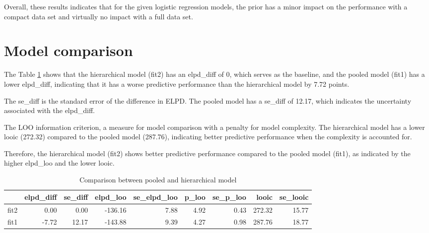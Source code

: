 \documentclass[a4paper]{artikel3}
\begin{document}
Overall, these results indicates that for the given logistic regression models, the prior has a minor impact on the performance with a compact data set and virtually no impact with a full data set.

\section{Model comparison}

The Table \ref{tab:model_compare} shows that the hierarchical model (fit2) has an elpd\_diff of 0, which serves as the baseline, and the pooled model (fit1) has a lower elpd\_diff, indicating that it has a worse predictive performance than the hierarchical model by 7.72 points.

The se\_diff is the standard error of the difference in ELPD. The pooled model has a se\_diff of 12.17, which indicates the uncertainty associated with the elpd\_diff. 

The LOO information criterion, a measure for model comparison with a penalty for model complexity. The hierarchical model has a lower looic (272.32) compared to the pooled model (287.76), indicating better predictive performance when the complexity is accounted for.

Therefore, the hierarchical model (fit2) shows better predictive performance compared to the pooled model (fit1), as indicated by the higher elpd\_loo and the lower looic.

\begin{table}[ht]
\centering
\caption{Comparison between pooled and hierarchical model}
\begin{tabular}{rrrrrrrrr}
  \hline
 & elpd\_diff & se\_diff & elpd\_loo & se\_elpd\_loo & p\_loo & se\_p\_loo & looic & se\_looic \\ 
  \hline
fit2 & 0.00 & 0.00 & -136.16 & 7.88 & 4.92 & 0.43 & 272.32 & 15.77 \\ 
  fit1 & -7.72 & 12.17 & -143.88 & 9.39 & 4.27 & 0.98 & 287.76 & 18.77 \\ 
   \hline
\end{tabular}
\label{tab:model_compare}
\end{table}

\end{document}
